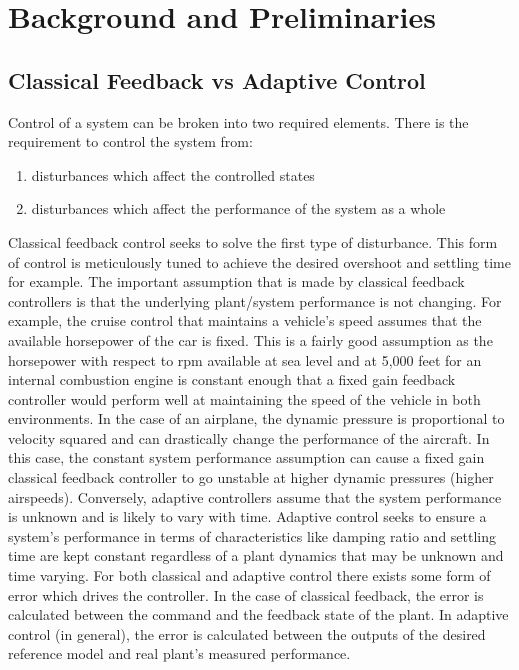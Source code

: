 \chapter{Background and Preliminaries}\label{ch:problem}

\section{Classical Feedback vs Adaptive Control}
Control of a system can be broken into two required elements.  There is the requirement to control the system from:
\begin{enumerate}
 \item disturbances which affect the controlled states 
 \item disturbances which affect the performance of the system as a whole
\end{enumerate}
Classical feedback control seeks to solve the first type of disturbance.  This form of control is meticulously tuned to achieve the desired overshoot and settling time for example.  The important assumption that is made by classical feedback controllers is that the underlying plant/system performance is not changing.  For example, the cruise control that maintains a vehicle's speed assumes that the available horsepower of the car is fixed.  This is a fairly good assumption as the horsepower with respect to rpm available at sea level and at 5,000 feet for an internal combustion engine is constant enough that a fixed gain feedback controller would perform well at maintaining the speed of the vehicle in both environments.  In the case of an airplane, the dynamic pressure is proportional to velocity squared and can drastically change the performance of the aircraft.  In this case, the constant system performance assumption can cause a fixed gain classical feedback controller to go unstable at higher dynamic pressures (higher airspeeds).   Conversely, adaptive controllers assume that the system performance is unknown and is likely to vary with time.  Adaptive control seeks to ensure a system's performance in terms of characteristics like damping ratio and settling time are kept constant regardless of a plant dynamics that may be unknown and time varying.  For both classical and adaptive control there exists some form of error which drives the controller.  In the case of classical feedback, the error is calculated between the command and the feedback state of the plant. In adaptive control (in general), the error is calculated between the outputs of the desired reference model and real plant's measured performance.

